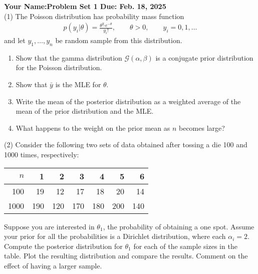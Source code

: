 \documentclass[final,11pt]{article}
\begin{document}
\thispagestyle{empty}
\begin{spacing}{1.25}

\textbf{Your Name:\hfill Problem Set 1 Due: Feb. 18, 2025}\\

(1) The Poisson distribution has probability mass function
\begin{gather}
    p(y_i|\theta)=\frac{\theta^{y_i}e^{-\theta}}{y_i!},\qquad \theta>0,\qquad y_i=0,1,\ldots
\end{gather}
and let $y_1,\ldots,y_n$ be random sample from this distribution.
\begin{enumerate}
    \item Show that the gamma distribution $\mathcal{G}(\alpha,\beta)$ is a conjugate prior distribution for the Poisson distribution.
    \item Show that $\bar{y}$ is the MLE for $\theta$.
    \item Write the mean of the posterior distribution as a weighted average of the mean of the prior distribution and the MLE.
    \item What happens to the weight on the prior mean as $n$ becomes large?
\end{enumerate}

\newpage

(2) Consider the following two sets of data obtained after tossing a die 100 and 1000 times, respectively:
\begin{center}
    \begin{tabular}{ r r r r r r r }
        \hline
        $n$ & 1 & 2 & 3 & 4 & 5 & 6 \\
        \hline
        100 & 19 & 12 & 17 & 18 & 20 & 14 \\  
        1000 & 190 & 120 & 170 & 180 & 200 & 140 \\
        \hline
    \end{tabular}
\end{center}
Suppose you are interested in $\theta_1$, the probability of obtaining a one spot. Assume your prior for all the probabilities is a Dirichlet distribution, where each $\alpha_i=2$. Compute the posterior distribution for $\theta_1$ for each of the sample sizes in the table. Plot the resulting distribution and compare the results. Comment on the effect of having a larger sample.

\end{spacing}
\end{document}
